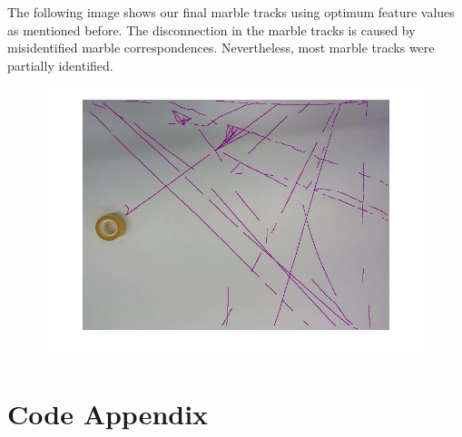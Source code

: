 \documentclass[10pt,a4paper,onecolumn]{report}
\begin{document}
The following image shows our final marble tracks using optimum feature values as mentioned before. The disconnection in the marble tracks is caused by misidentified marble correspondences. Nevertheless, most marble tracks were partially identified.

\begin{center}
	\begin{figure}[h!]
		\includegraphics[width=15cm]{track_purple_30diff.png}
	\end{figure}
\end{center}

\chapter{Code Appendix}
\end{document}
